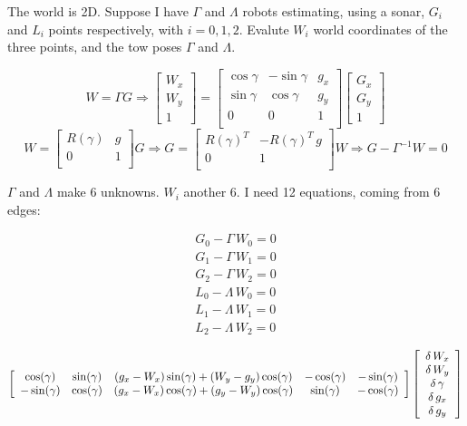 \documentclass[a4paper]{article}
\newcommand{\cg}{\cos(\gamma)}
\newcommand{\sg}{\sin(\gamma)}
\begin{document}
The world is 2D.
Suppose I have $\Gamma$ and $\Lambda$ robots estimating, using a sonar,
$G_i$ and $L_i$ points respectively, with $i = {0,1,2}$. Evalute $W_i$ world
coordinates of the three points, and the tow poses $\Gamma$ and $\Lambda$.

\[
W = \Gamma G \Rightarrow
\left[
\begin{array}{c}
W_x\\
W_y\\
1
\end{array}\right]
=
\left[
\begin{array}{ccc}
\cos{\gamma} & -\sin{\gamma} & g_x\\
\sin{\gamma} & \cos{\gamma} & g_y\\
0 & 0 & 1\\
\end{array}\right]
\left[
\begin{array}{c}
G_x\\
G_y\\
1
\end{array}\right]
\]
\[
W =
\left[
\begin{array}{cc}
R(\gamma) & g\\
0 & 1\\
\end{array}
\right] G
\Rightarrow
G =
\left[
\begin{array}{cc}
R(\gamma)^T & -R(\gamma)^T\,g\\
0 & 1\\
\end{array}
\right] W
\Rightarrow
G - \Gamma^{-1} W = 0
\]

$\Gamma$ and $\Lambda$ make 6 unknowns. $W_i$ another 6.
I need 12 equations, coming from 6 edges:

\begin{align}
G_0 - \Gamma\, W_0 = 0\nonumber\\
G_1 - \Gamma\, W_1 = 0\nonumber\\
G_2 - \Gamma\, W_2 = 0\nonumber\\
L_0 - \Lambda\, W_0 = 0\nonumber\\
L_1 - \Lambda\, W_1 = 0\nonumber\\
L_2 - \Lambda\, W_2 = 0\nonumber
\end{align}

\[
\left[
\begin{array}{c c c c c}
 \cg & \sg & (g_x-W_x)\sg+(W_y-g_y)\cg & -\cg & -\sg \\
-\sg & \cg & (g_x-W_x)\cg+(g_y-W_y)\cg & \sg & -\cg
\end{array}
\right]
\left[
\begin{array}{c}
\delta\, W_{x}\\ %
\delta\, W_{y}\\ %
\delta\, \gamma\\ %
\delta\, g_x\\    %
\delta\, g_y\\    %
\end{array}
\right]
\]
\end{document}
